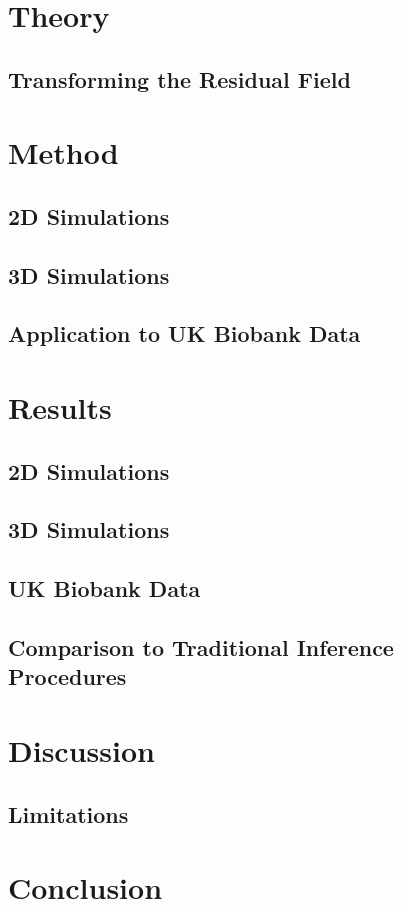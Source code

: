 \section{Theory}

\subsection{Transforming the Residual Field}

\section{Method}

\subsection{2D Simulations}

\subsection{3D Simulations}

\subsection{Application to UK Biobank Data}

\section{Results}

\subsection{2D Simulations}

\subsection{3D Simulations}

\subsection{UK Biobank Data}

\subsection{Comparison to Traditional Inference Procedures}

\section{Discussion}

\subsection{Limitations}

\section{Conclusion}
